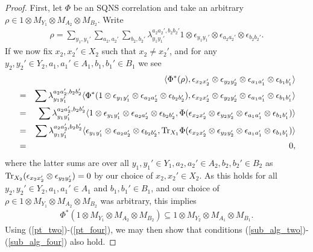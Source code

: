 \documentclass[11pt]{amsart}
\begin{document}
\begin{proof}
First, let $\Phi$ be an SQNS correlation and take an arbitrary $\rho \in 1\otimes M_{Y_{1}}\otimes M_{A_{2}}\otimes M_{B_{2}}$. Write
\begin{gather*}
	\rho = \sum\limits_{y_{1}, y_{1}'}\sum\limits_{a_{2}, a_{2}'}\sum\limits_{b_{2}, b_{2}'}\lambda_{y_{1}y_{1}'}^{a_{2}a_{2}', b_{2}b_{2}'}1\otimes \epsilon_{y_{1}y_{1}'}\otimes\epsilon_{a_{2}a_{2}'}\otimes \epsilon_{b_{2}b_{2}'}.
\end{gather*}
\noindent If we now fix $x_{2}, x_{2}' \in X_{2}$ such that $x_{2} \neq x_{2}'$, and for any $y_{2}, y_{2}' \in Y_{2}, a_{1}, a_{1}' \in A_{1}, b_{1}, b_{1}' \in B_{1}$ we see
\begin{eqnarray*}
& &
	\langle \Phi^{*}(\rho), \epsilon_{x_{2}x_{2}'}\otimes \epsilon_{y_{2}y_{2}'}\otimes \epsilon_{a_{1}a_{1}'}\otimes \epsilon_{b_{1}b_{1}'}\rangle \\
& = &
\sum\lambda_{y_{1}y_{1}'}^{a_{2}a_{2}', b_{2}b_{2}'}\langle\Phi^{*}(1\otimes \epsilon_{y_{1}y_{1}'}\otimes \epsilon_{a_{2}a_{2}'}\otimes \epsilon_{b_{2}b_{2}'}), \epsilon_{x_{2}x_{2}'}\otimes \epsilon_{y_{2}y_{2}'}\otimes \epsilon_{a_{1}a_{1}'}\otimes \epsilon_{b_{1}b_{1}'}\rangle \\
& = &
\sum\lambda_{y_{1}y_{1}'}^{a_{2}a_{2}', b_{2}b_{2}'}\langle 1\otimes \epsilon_{y_{1}y_{1}'}\otimes\epsilon_{a_{2}a_{2}'}\otimes \epsilon_{b_{2}b_{2}'}, \Phi(\epsilon_{x_{2}x_{2}'}\otimes \epsilon_{y_{2}y_{2}'}\otimes \epsilon_{a_{1}a_{1}'}\otimes \epsilon_{b_{1}b_{1}'})\rangle \\
& = &
\sum\lambda_{y_{1}y_{1}'}^{a_{2}a_{2}', b_{2}b_{2}'}\langle \epsilon_{y_{1}y_{1}'}\otimes \epsilon_{a_{2}a_{2}'}\otimes \epsilon_{b_{2}b_{2}'}, {\rm Tr}_{X_{1}}\Phi(\epsilon_{x_{2}x_{2}'}\otimes \epsilon_{y_{2}y_{2}'}\otimes \epsilon_{a_{1}a_{1}'}\otimes \epsilon_{b_{1}b_{1}'})\rangle \\
& = &
0,
\end{eqnarray*}
\noindent where the latter sums are over all $y_{1}, y_{1}' \in Y_{1}, a_{2}, a_{2}' \in A_{2}, b_{2}, b_{2}' \in B_{2}$ as ${\rm Tr}_{X_{2}}(\epsilon_{x_{2}x_{2}'}\otimes \epsilon_{y_{2}y_{2}'}) = 0$ by our choice of $x_{2}, x_{2}' \in X_{2}$. As this holds for all $y_{2}, y_{2}' \in Y_{2}, a_{1}, a_{1}' \in A_{1}$ and $b_{1}, b_{1}' \in B_{1}$, and our choice of $\rho \in 1\otimes M_{Y_{1}}\otimes M_{A_{2}}\otimes M_{B_{2}}$ was arbitrary, this implies 
\begin{gather*}
	\Phi^{*}(1\otimes M_{Y_{1}}\otimes M_{A_{2}}\otimes M_{B_{2}}) \subseteq 1\otimes M_{Y_{2}}\otimes M_{A_{1}}\otimes M_{B_{1}}.
\end{gather*}
\noindent Using (\ref{pt_two})-(\ref{pt_four}), we may then show that conditions (\ref{sub_alg_two})-(\ref{sub_alg_four}) also hold. 


\end{proof}
\end{document}

